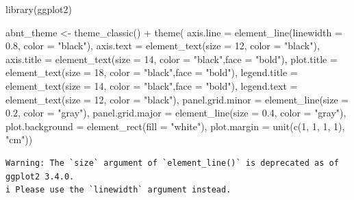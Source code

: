 \documentclass[
]{article}
\newenvironment{Shaded}{\begin{snugshade}}{\end{snugshade}}
\newcommand{\AttributeTok}[1]{\textcolor[rgb]{0.40,0.45,0.13}{#1}}
\newcommand{\DecValTok}[1]{\textcolor[rgb]{0.68,0.00,0.00}{#1}}
\newcommand{\FloatTok}[1]{\textcolor[rgb]{0.68,0.00,0.00}{#1}}
\newcommand{\FunctionTok}[1]{\textcolor[rgb]{0.28,0.35,0.67}{#1}}
\newcommand{\NormalTok}[1]{\textcolor[rgb]{0.00,0.23,0.31}{#1}}
\newcommand{\OtherTok}[1]{\textcolor[rgb]{0.00,0.23,0.31}{#1}}
\newcommand{\SpecialCharTok}[1]{\textcolor[rgb]{0.37,0.37,0.37}{#1}}
\newcommand{\StringTok}[1]{\textcolor[rgb]{0.13,0.47,0.30}{#1}}
\begin{document}
\begin{Shaded}
\begin{Highlighting}[]
\FunctionTok{library}\NormalTok{(ggplot2)}

\NormalTok{abnt\_theme }\OtherTok{\textless{}{-}} \FunctionTok{theme\_classic}\NormalTok{() }\SpecialCharTok{+} 
    \FunctionTok{theme}\NormalTok{(}
      \AttributeTok{axis.line =} \FunctionTok{element\_line}\NormalTok{(}\AttributeTok{linewidth =} \FloatTok{0.8}\NormalTok{, }\AttributeTok{color =} \StringTok{"black"}\NormalTok{),}
      \AttributeTok{axis.text =} \FunctionTok{element\_text}\NormalTok{(}\AttributeTok{size =} \DecValTok{12}\NormalTok{, }\AttributeTok{color =} \StringTok{"black"}\NormalTok{),}
      \AttributeTok{axis.title =} \FunctionTok{element\_text}\NormalTok{(}\AttributeTok{size =} \DecValTok{14}\NormalTok{, }\AttributeTok{color =} \StringTok{"black"}\NormalTok{,}\AttributeTok{face =} \StringTok{"bold"}\NormalTok{),}
      \AttributeTok{plot.title =} \FunctionTok{element\_text}\NormalTok{(}\AttributeTok{size =} \DecValTok{18}\NormalTok{, }\AttributeTok{color =} \StringTok{"black"}\NormalTok{,}\AttributeTok{face =} \StringTok{"bold"}\NormalTok{),}
      \AttributeTok{legend.title =} \FunctionTok{element\_text}\NormalTok{(}\AttributeTok{size =} \DecValTok{14}\NormalTok{, }\AttributeTok{color =} \StringTok{"black"}\NormalTok{,}\AttributeTok{face =} \StringTok{"bold"}\NormalTok{),}
      \AttributeTok{legend.text =} \FunctionTok{element\_text}\NormalTok{(}\AttributeTok{size =} \DecValTok{12}\NormalTok{, }\AttributeTok{color =} \StringTok{"black"}\NormalTok{),}
      \AttributeTok{panel.grid.minor =} \FunctionTok{element\_line}\NormalTok{(}\AttributeTok{size =} \FloatTok{0.2}\NormalTok{, }\AttributeTok{color =} \StringTok{"gray"}\NormalTok{),}
      \AttributeTok{panel.grid.major =} \FunctionTok{element\_line}\NormalTok{(}\AttributeTok{size =} \FloatTok{0.4}\NormalTok{, }\AttributeTok{color =} \StringTok{"gray"}\NormalTok{),}
      \AttributeTok{plot.background =} \FunctionTok{element\_rect}\NormalTok{(}\AttributeTok{fill =} \StringTok{"white"}\NormalTok{),}
      \AttributeTok{plot.margin =} \FunctionTok{unit}\NormalTok{(}\FunctionTok{c}\NormalTok{(}\DecValTok{1}\NormalTok{, }\DecValTok{1}\NormalTok{, }\DecValTok{1}\NormalTok{, }\DecValTok{1}\NormalTok{), }\StringTok{"cm"}\NormalTok{))}
\end{Highlighting}
\end{Shaded}

\begin{verbatim}
Warning: The `size` argument of `element_line()` is deprecated as of ggplot2 3.4.0.
i Please use the `linewidth` argument instead.
\end{verbatim}
\end{document}
